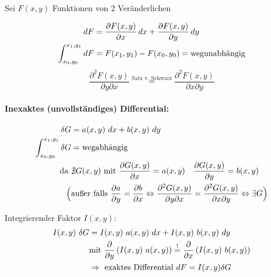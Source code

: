 Sei $F(x,y)$ Funktionen von 2 Veränderlichen
\begin{wrapfigure}{l}{2cm}
 \end{wrapfigure}
\begin{align}
    dF &= \frac{\partial F(x,y)}{\partial x} \, dx + \frac{\partial F(x,y)}{\partial y} \, dy \\
    \int_{x_0,y_0}^{x_1,y_1} dF &= F(x_1,y_1) - F(x_0,y_0) = \text{wegunabhängig}
\end{align}
\begin{equation}
    \frac{\partial^2 F(x,y)}{\partial y \partial x} \stackrel{\text{Satz v. Schwarz}}{=} \frac{\partial^2 F(x,y)}{\partial x \partial y}
\end{equation}

\paragraph{Inexaktes (unvollständiges) Differential:}
\begin{align}
    \delta G &= a(x,y) \ dx + b(x,y) \ dy \\
     \int_{x_0,y_0}^{x_1,y_1} \delta G &= \text{wegabhängig}\\
     \text{da } &\nexists G(x,y) \text{ mit } \frac{\partial G(x,y)}{\partial x} = a(x,y) \quad \frac{\partial G(x,y)}{\partial y} = b(x,y) \\
     \Big( &\text{außer falls } \frac{\partial a}{\partial y} = \frac{\partial b}{\partial x} \Leftrightarrow \frac{\partial^2 G(x,y)}{\partial y \partial x} = \frac{\partial^2 G(x,y)}{\partial x \partial y} \Leftrightarrow \exists G \Big)
\end{align}

Integrierender Faktor $I(x,y)$:
\begin{align}
    I(x,y) \ \delta G &= I(x,y) \ a(x,y) \ dx + I(x,y) \ b(x,y) \ dy \\
    &\text{mit } \frac{\partial }{\partial y}\left( I(x,y) \ a(x,y) \right) \stackrel{!}{=} \frac{\partial }{\partial x}\left( I(x,y) \ b(x,y) \right) \\
    &\Rightarrow \text{ exaktes Differential } dF = I(x,y) \delta G
\end{align}

